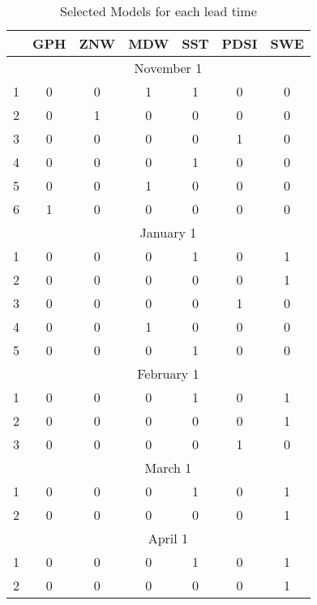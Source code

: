 \documentclass[final,5p,times,twocolumn,authoryear]{elsarticle}
\begin{document}
\begin{table}[ht]
\centering
\caption{Selected Models for each lead time}\label{tab:models}
\begin{tabular}{rcccccc} 
\toprule
& GPH & ZNW & MDW & SST & PDSI & SWE \\
\midrule
& \multicolumn{6}{c}{November 1} \\
\midrule
1 & 0 & 0 & 1 & 1 & 0 & 0\\
2 & 0 & 1 & 0 & 0 & 0 & 0\\
3 & 0 & 0 & 0 & 0 & 1 & 0\\
4 & 0 & 0 & 0 & 1 & 0 & 0\\
5 & 0 & 0 & 1 & 0 & 0 & 0\\
6 & 1 & 0 & 0 & 0 & 0 & 0\\
\midrule
& \multicolumn{6}{c}{January 1} \\
\midrule
1 & 0 & 0 & 0 & 1 & 0 & 1\\
2 & 0 & 0 & 0 & 0 & 0 & 1\\
3 & 0 & 0 & 0 & 0 & 1 & 0\\
4 & 0 & 0 & 1 & 0 & 0 & 0\\
5 & 0 & 0 & 0 & 1 & 0 & 0\\
\midrule
& \multicolumn{6}{c}{February 1} \\
\midrule
1 & 0 & 0 & 0 & 1 & 0 & 1\\
2 & 0 & 0 & 0 & 0 & 0 & 1\\
3 & 0 & 0 & 0 & 0 & 1 & 0\\
\midrule
& \multicolumn{6}{c}{March 1} \\
\midrule
1 & 0 & 0 & 0 & 1 & 0 & 1\\
2 & 0 & 0 & 0 & 0 & 0 & 1\\
\midrule
& \multicolumn{6}{c}{April 1} \\
\midrule
1 & 0 & 0 & 0 & 1 & 0 & 1\\
2 & 0 & 0 & 0 & 0 & 0 & 1\\
\bottomrule
\end{tabular}
\end{table}
 
\end{document}
